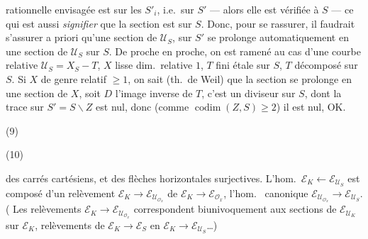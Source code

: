 \documentclass[11pt,a4paper]{article}
\begin{document}
rationnelle envisagée est  sur les $S'_i$, i.e.\ sur $S'$ --- alors elle est vérifiée  à $S$ --- ce qui est aussi \emph{signifier} que la section est  sur $S$. Donc, pour se rassurer, il faudrait s'assurer a priori qu'une section de $\mathcal{U}_S$, sur $S'$ se prolonge automatiquement  en une section de $\mathcal{U}_S$ sur $S$.  De proche en proche, on est ramené au cas d'une courbe relative $\mathcal{U}_S = X_S - T$, $X$ lisse   dim.\ relative $1$, $T$ fini étale sur $S$, \struck{\ill{}}  $T$ décomposé sur $S$. Si $X$ de genre relatif $\geqslant 1$, on sait (th.\ de Weil) que la section se prolonge en une section de $X$, soit $D$ l'image inverse de $T$, c'est un diviseur sur $S$, dont la trace sur $S' = S \smallsetminus Z$ est nul, donc (comme $\operatorname{codim}(Z, S) \geqslant 2$) il est nul, OK.


(9)


(10)



 des carrés cartésiens, et des flèches horizontales surjectives. L'hom.\ $\mathcal{E}_K \leftarrow \mathcal{E}_{\mathcal{U}_S}$  est composé d'un relèvement $\mathcal{E}_K \to \mathcal{E}_{\mathcal{U}_{\mathcal{O}_x}}$ de $\mathcal{E}_K \to \mathcal{E}_{\mathcal{O}_x}$,  l'hom.\  canonique $\mathcal{E}_{\mathcal{U}_{\mathcal{O}_x}} \to \mathcal{E}_{\mathcal{U}_S}$. ( Les relèvements $\mathcal{E}_K \to \mathcal{E}_{\mathcal{U}_{\mathcal{O}_x}}$ correspondent biunivoquement aux sections de $\mathcal{E}_{\mathcal{U}_K}$ sur $\mathcal{E}_K$,  relèvements de $\mathcal{E}_K \to \mathcal{E}_S$ en $\mathcal{E}_K \to \mathcal{E}_{\mathcal{U}_S}$…)
\end{document}
